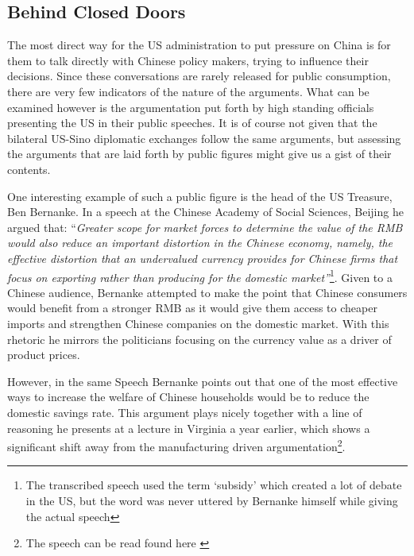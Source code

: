 \subsection{Behind Closed Doors}

The most direct way for the US administration to put pressure on China 
is for them to talk directly with Chinese policy makers, trying to 
influence their decisions. Since these conversations are rarely released 
for public consumption, there are very few indicators of the nature of 
the arguments. What can be examined however is the argumentation put 
forth by high standing officials presenting the US in their public 
speeches. It is of course not given that the bilateral US-Sino 
diplomatic exchanges follow the same arguments, but assessing the 
arguments that are laid forth by public figures might give us a gist of 
their contents.

One interesting example of such a public figure is the head of the US 
Treasure, Ben Bernanke. In a speech at the Chinese Academy of Social 
Sciences, Beijing he argued that: ``\textit{Greater scope for market 
	forces to determine the value of the RMB would also reduce an 
	important distortion in the Chinese economy, namely, the effective 
	distortion that an undervalued currency provides for Chinese firms 
	that focus on exporting rather than producing for the domestic 
market''}\footnote{The transcribed speech \cite{Bernanke06} used the 
term `subsidy' which created a lot of debate in the US, but the word was 
never uttered by Bernanke himself while giving the actual 
speech\cite{reuters06}}. Given to a Chinese audience, Bernanke attempted 
to make the point that Chinese consumers would benefit from a stronger 
RMB as it would give them access to cheaper imports and strengthen 
Chinese companies on the domestic market. With this rhetoric he mirrors 
the politicians focusing on the currency value as a driver of product 
prices.

However, in the same Speech Bernanke points out that one of the most 
effective ways to increase the welfare of Chinese households would be to 
reduce the domestic savings rate. This argument plays nicely together 
with a line of reasoning he presents at a lecture in Virginia a year 
earlier, which shows a significant shift away from the manufacturing 
driven argumentation\footnote{The speech can be read found here 
\cite{Bernanke05}}.

